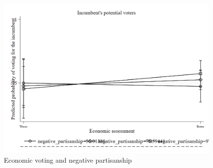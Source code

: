 \documentclass[a4paper, svgnames]{article}
\begin{document}
\begin{figure}[H]
	\centering
	\includegraphics[scale=0.35]{Figures/negative_margins.png}
	\caption{\label{fig:negative-margins} Economic voting and negative partisanship}
\end{figure}

\end{document}
